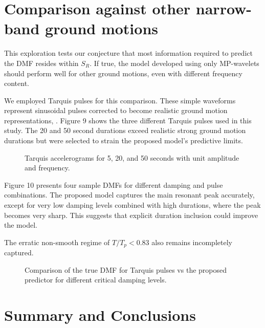 \section{Comparison against other narrow-band ground
motions}\label{comparison-against-other-narrow-band-ground-motions}

This exploration tests our conjecture that most information required to
predict the DMF resides within \(S_R\). If true, the model developed
using only MP-wavelets should perform well for other ground motions,
even with different frequency content.

We employed Tarquis pulses for this comparison. These simple waveforms
represent sinusoidal pulses corrected to become realistic ground motion
representations,
. Figure 9 shows the three different
Tarquis pulses used in this study. The 20 and 50 second durations exceed
realistic strong ground motion durations but were selected to strain the
proposed model's predictive limits.

\begin{figure}
\centering
{}
\caption{Tarquis accelerograms for 5, 20, and 50 seconds with unit
amplitude and frequency.}
\end{figure}

Figure 10 presents four sample DMFs for different damping and pulse
combinations. The proposed model captures the main resonant peak
accurately, except for very low damping levels combined with high
durations, where the peak becomes very sharp. This suggests that
explicit duration inclusion could improve the model.

The erratic non-smooth regime of \(T/T_p < 0.83\) also remains
incompletely captured.

\begin{figure}
\centering
{}
\caption{Comparison of the true DMF for Tarquis pulses vs the proposed
predictor for different critical damping levels.}
\end{figure}

\section{Summary and Conclusions}\label{summary-and-conclusions}

